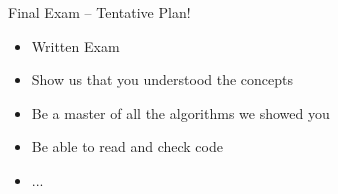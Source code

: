\documentclass[aspectratio=169]{../latex_main/tntbeamer}  %
\begin{document}
\begin{frame}[c]{Final Exam -- Tentative Plan!}

\begin{itemize}
  \item Written Exam
  \item Show us that you understood the concepts
  \item Be a master of all the algorithms we showed you
  \item Be able to read and check code
  \item ...
\end{itemize}

\end{frame}
\end{document}

